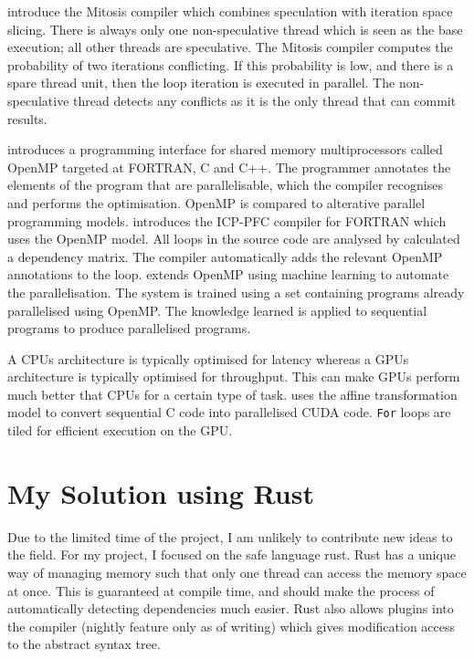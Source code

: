 \textcite{Quinones2005} introduce the Mitosis compiler which combines speculation with iteration space slicing. There is always only one non-speculative thread which is seen as the base execution; all other threads are speculative. The Mitosis compiler computes the probability of two iterations conflicting. If this probability is low, and there is a spare thread unit, then the loop iteration is executed in parallel. The non-speculative thread detects any conflicts as it is the only thread that can commit results.

\textcite{Dagum1998} introduces a programming interface for shared memory multiprocessors called OpenMP targeted at FORTRAN, C and C++. The programmer annotates the elements of the program that are parallelisable, which the compiler recognises and performs the optimisation. OpenMP is compared to alterative parallel programming models.
\textcite{Kim2000} introduces the ICP-PFC compiler for FORTRAN which uses the OpenMP model. All loops in the source code are analysed by calculated a dependency matrix. The compiler automatically adds the relevant OpenMP annotations to the loop.
\textcite{Lam2011} extends OpenMP using machine learning to automate the parallelisation. The system is trained using a set containing programs already parallelised using OpenMP. The knowledge learned is applied to sequential programs to produce parallelised programs.

A CPUs architecture is typically optimised for latency whereas a GPUs architecture is typically optimised for throughput. This can make GPUs perform much better that CPUs for a certain type of task. \textcite{Baskaran2010} uses the affine transformation model to convert sequential C code into parallelised CUDA code. \texttt{For} loops are tiled for efficient execution on the GPU.

\section{My Solution using Rust}
Due to the limited time of the project, I am unlikely to contribute new ideas to the field.  For my project, I focused on the safe language rust. Rust has a unique way of managing memory such that only one thread can access the memory space at once. This is guaranteed at compile time, and should make the process of automatically detecting dependencies much easier. Rust also allows plugins into the compiler (nightly feature only as of writing) which gives modification access to the abstract syntax tree.

